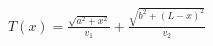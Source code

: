 \documentclass[preview]{standalone}
\begin{document}
\begin{align*}
T(x) = \frac{\sqrt{a^2+x^2}}{v_1} + \frac{\sqrt{b^2+(L-x)^2}}{v_2}
\end{align*}
\end{document}

